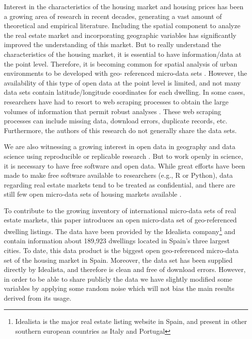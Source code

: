 \documentclass[Royal,times,sageh]{sagej}
\begin{document}
Interest in the characteristics of the housing market and housing prices
has been a growing area of research in recent decades, generating a vast
amount of theoretical and empirical literature. Including the spatial
component to analyze the real estate market and incorporating geographic
variables has significantly improved the understanding of this market.
But to really understand the characteristics of the housing market, it
is essential to have information/data at the point level. Therefore, it
is becoming common for spatial analysis of urban environments to be
developed with geo- referenced micro-data sets \citep{lopez2015}.
However, the availability of this type of open data at the point level
is limited, and not many data sets contain latitude/longitude
coordinates for each dwelling. In some cases, researchers have had to
resort to web scraping processes to obtain the large volumes of
information that permit robust analyses
\citep{gupta2022take, arbia2020spatial, Li2019, lopez2015}. These web
scraping processes can include missing data, download errors, duplicate
records, etc. Furthermore, the authors of this research do not generally
share the data sets.

We are also witnessing a growing interest in open data in geography and
data science \citep{arribasl2021editorial, arribas2021} using
reproducible or replicable research
\citep{paez2021open, brunsdon2021opening}. But to work openly in
science, it is necessary to have free software and open data. While
great efforts have been made to make free software available to
researchers (e.g., R or Python), data regarding real estate markets tend
to be treated as confidential, and there are still few open micro-data
sets of housing markets available \citep{Song2021}.

To contribute to the growing inventory of international micro-data sets
of real estate markets, this paper introduces an open micro-data set of
geo-referenced dwelling listings. The data have been provided by the
Idealista
company\footnote{Idealista is the major real estate listing website in Spain, and present in other southern european countries as Italy and Portugal}
and contain information about 189,923 dwellings located in Spain's three
largest cities. To date, this data product is the biggest open
geo-referenced micro-data set of the housing market in Spain. Moreover,
the data set has been supplied directly by Idealista, and therefore is
clean and free of download errors. However, in order to be able to share
publicly the data we have slightly modified some variables by applying
some random noise which will not bias the main results derived from its
usage.
\end{document}
